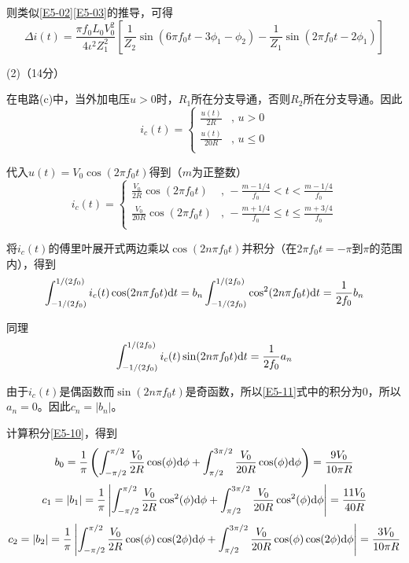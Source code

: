 \documentclass[10pt,a4paper,onecolumn,UTF8]{ctexart}
\begin{document}
	则类似\eqref{E5-02}\eqref{E5-03}的推导，可得
	\begin{equation}
		\Delta i(t)=\frac{\pi f_0L_0V_0^2}{4\iota^2Z_1^2}\left[\frac{1}{Z_2}\sin(6\pi f_0t-3\phi_1-\phi_2)-\frac{1}{Z_1}\sin(2\pi f_0t-2\phi_1)\right]
	\end{equation}
	
	(2)（14分）
	
	在电路(c)中，当外加电压$u>0$时，$R_1$所在分支导通，否则$R_2$所在分支导通。因此
	\begin{equation}
		i_c(t)=\left\{\begin{aligned}
			\frac{u(t)}{2R}&,\,u>0\\
			\frac{u(t)}{20R}&,\,u\leq0\\
		\end{aligned}\right.
	\end{equation}
	
	代入$u(t)=V_0\cos(2\pi f_0 t)$得到（$m$为正整数）
	\begin{equation}
		i_c(t)=\left\{\begin{aligned}
			\frac{V_0}{2R}\cos(2\pi f_0 t)&,\,-\frac{m-1/4}{f_0}<t<\frac{m-1/4}{f_0}\\
			\frac{V_0}{20R}\cos(2\pi f_0 t)&,\,-\frac{m+1/4}{f_0}\leq t\leq\frac{m+3/4}{f_0}\\
		\end{aligned}\right.
	\end{equation}
	
	将$i_c(t)$的傅里叶展开式两边乘以$\cos(2n\pi f_0t)$并积分（在$2\pi f_0t=-\pi$到$\pi$的范围内），得到
	\begin{equation}\label{E5-10}
		\int_{-1/(2f_0)}^{1/(2f_0)}i_c(t)\cos(2n\pi f_0t)\mathrm{d} t=b_n\int_{-1/(2f_0)}^{1/(2f_0)}\cos^2(2n\pi f_0t)\mathrm{d} t=\frac{1}{2f_0}b_n
	\end{equation}
	
	同理
	\begin{equation}\label{E5-11}
		\int_{-1/(2f_0)}^{1/(2f_0)}i_c(t)\sin(2n\pi f_0t)\mathrm{d} t=\frac{1}{2f_0}a_n
	\end{equation}
	
	由于$i_c(t)$是偶函数而$\sin(2n\pi f_0t)$是奇函数，所以\eqref{E5-11}式中的积分为0，所以$a_n=0$。因此$c_n=|b_n|$。
	
	计算积分\eqref{E5-10}，得到
	\begin{equation}
		b_0=\frac{1}{\pi}\left(\int_{-\pi/2}^{\pi/2}\frac{V_0}{2R}\cos(\phi)\mathrm{d}\phi+\int_{\pi/2}^{3\pi/2}\frac{V_0}{20R}\cos(\phi)\mathrm{d}\phi\right)=\frac{9V_0}{10\pi R}
	\end{equation}
	\begin{equation}
		c_1=|b_1|=\frac{1}{\pi}\left|\int_{-\pi/2}^{\pi/2}\frac{V_0}{2R}\cos^2(\phi)\mathrm{d}\phi+\int_{\pi/2}^{3\pi/2}\frac{V_0}{20R}\cos^2(\phi)\mathrm{d}\phi\right|=\frac{11V_0}{40R}
	\end{equation}
	\begin{equation}
		c_2=|b_2|=\frac{1}{\pi}\left|\int_{-\pi/2}^{\pi/2}\frac{V_0}{2R}\cos(\phi)\cos(2\phi)\mathrm{d}\phi+\int_{\pi/2}^{3\pi/2}\frac{V_0}{20R}\cos(\phi)\cos(2\phi)\mathrm{d}\phi\right|=\frac{3V_0}{10\pi R}
	\end{equation}
	
\end{document}
